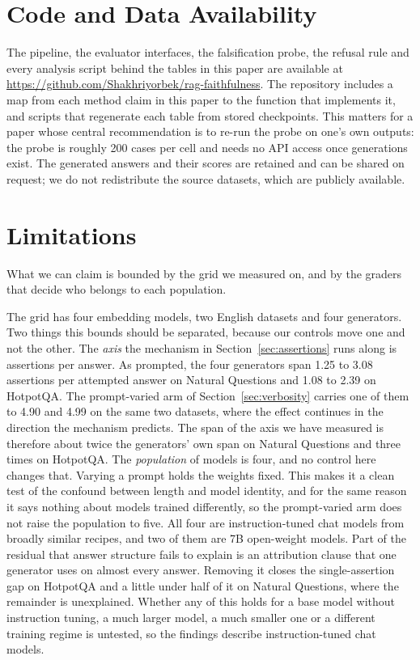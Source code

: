 \documentclass[11pt]{article}
\begin{document}
\section*{Code and Data Availability}

The pipeline, the evaluator interfaces, the falsification probe, the refusal rule and every analysis script behind the tables in this paper are available at \url{https://github.com/Shakhriyorbek/rag-faithfulness}. The repository includes a map from each method claim in this paper to the function that implements it, and scripts that regenerate each table from stored checkpoints. This matters for a paper whose central recommendation is to re-run the probe on one's own outputs: the probe is roughly 200 cases per cell and needs no API access once generations exist. The generated answers and their scores are retained and can be shared on request; we do not redistribute the source datasets, which are publicly available.


\section*{Limitations}

What we can claim is bounded by the grid we measured on, and by the graders that decide who belongs to each population.

The grid has four embedding models, two English datasets and four generators. Two things this bounds should be separated, because our controls move one and not the other. The \emph{axis} the mechanism in Section~\ref{sec:assertions} runs along is assertions per answer. As prompted, the four generators span 1.25 to 3.08 assertions per attempted answer on Natural Questions and 1.08 to 2.39 on HotpotQA. The prompt-varied arm of Section~\ref{sec:verbosity} carries one of them to 4.90 and 4.99 on the same two datasets, where the effect continues in the direction the mechanism predicts. The span of the axis we have measured is therefore about twice the generators' own span on Natural Questions and three times on HotpotQA. The \emph{population} of models is four, and no control here changes that. Varying a prompt holds the weights fixed. This makes it a clean test of the confound between length and model identity, and for the same reason it says nothing about models trained differently, so the prompt-varied arm does not raise the population to five. All four are instruction-tuned chat models from broadly similar recipes, and two of them are 7B open-weight models. Part of the residual that answer structure fails to explain is an attribution clause that one generator uses on almost every answer. Removing it closes the single-assertion gap on HotpotQA and a little under half of it on Natural Questions, where the remainder is unexplained. Whether any of this holds for a base model without instruction tuning, a much larger model, a much smaller one or a different training regime is untested, so the findings describe instruction-tuned chat models.
\end{document}
